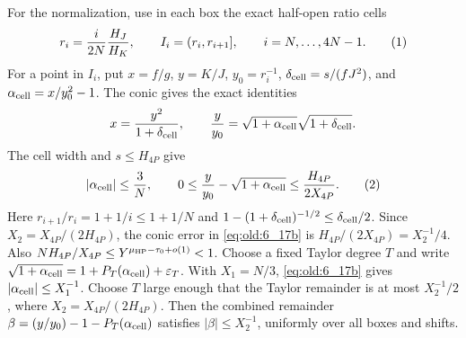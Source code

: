 For the normalization, use in each box the exact half-open ratio cells
\[
 r_i=\frac{i}{2N}\frac{H_J}{ H_K},\qquad
 I_i=(r_i,r_{i+1}],\qquad i=N,\ldots,4N-1 .                 \AutoTag{eq:old:6_17a}
\]
For a point in \(I_i\), put \(x=f/g\), \(y=K/J\), \(y_0=r_i^{-1}\),
\(\delta_{\rm cell}=s/(fJ^2)\), and \(\alpha_{\rm cell}=x/y_0^2-1\).
The conic gives the exact
identities
\[
 x=\frac{y^2}{1+\delta_{\rm cell}},\qquad
 \frac{y}{ y_0}=\sqrt{1+\alpha_{\rm cell}}\sqrt{1+\delta_{\rm cell}}.
\]
The cell width and \(s\le H_{4P}\) give
\[
 |\alpha_{\rm cell}|\le \frac{3}{ N},\qquad
 0\le \frac{y}{y_0}-\sqrt{1+\alpha_{\rm cell}}\le \frac{H_{4P}}{2X_{4P}}.       \AutoTag{eq:old:6_17b}
\]
Here \(r_{i+1}/r_i=1+1/i\le1+1/N\) and
\(1-(1+\delta_{\rm cell})^{-1/2}\le\delta_{\rm cell}/2\).  Since
\(X_2=X_{4P}/(2H_{4P})\), the conic error in \eqref{eq:old:6_17b} is
\(H_{4P}/(2X_{4P})=X_2^{-1}/4\).  Also
\(NH_{4P}/X_{4P}\le Y^{\mu_{\rm HP}-\tau_0+o(1)}<1\).  Choose a fixed
Taylor degree \(T\) and write
\(\sqrt{1+\alpha_{\rm cell}}=1+P_T(\alpha_{\rm cell})+\varepsilon_T\).
With \(X_1=N/3\), \eqref{eq:old:6_17b} gives
\(|\alpha_{\rm cell}|\le X_1^{-1}\). Choose \(T\)
large enough that the Taylor remainder is at most \(X_2^{-1}/2\), where
\(X_2=X_{4P}/(2H_{4P})\). Then the combined remainder
\(\beta=(y/y_0)-1-P_T(\alpha_{\rm cell})\) satisfies \(|\beta|\le X_2^{-1}\),
uniformly over all boxes and shifts.

